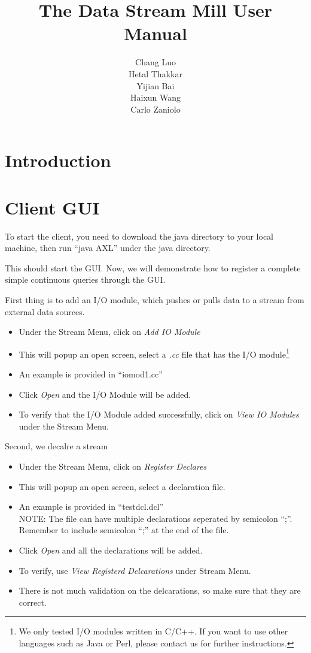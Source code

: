 \documentclass[10pt]{report}
\title{\Huge \bf The Data Stream Mill User Manual \\}
\author{\Large Chang Luo \\[0.1cm]\Large Hetal Thakkar\\[0.1cm]\Large Yijian Bai \\[0.1cm] \Large Haixun Wang\\[0.1cm] \Large Carlo Zaniolo}
\begin{document}
\maketitle

\tableofcontents
\chapter{Introduction}
\chapter{Client GUI}
To start the client, you need to download the java directory to your local machine, then run ``java AXL'' under the java directory.

This should start the GUI. Now, we
will demonstrate how to register a complete simple continuous queries through the GUI.

First thing is to add an I/O module, which pushes or pulls data to a
stream from external data sources.
\begin{itemize}
  \item Under the Stream Menu, click on {\em Add IO Module}
  \item This will popup an open screen, select a {\em.cc} file that has the
I/O module\footnote{We only tested I/O modules written in C/C++.  If you want to use other languages such as Java or Perl, please contact us for further instructions.}
  \item An example is provided in ``iomod1.cc''
  \item Click {\em Open} and the I/O Module will be added.
  \item To verify that the I/O Module added successfully, click on {\em View IO Modules} under the Stream Menu.
\end{itemize}

Second, we decalre a stream
\begin{itemize}
  \item Under the Stream Menu, click on {\em Register Declares}
  \item This will popup an open screen, select a declaration file.
  \item An example is provided in ``testdcl.dcl''\\
    NOTE: The file can have multiple declarations seperated by semicolon ``;''.
Remember to include semicolon ``;'' at the end of the file.
  \item Click {\em Open} and all the declarations will be added.
  \item To verify, use {\em View Registerd Delcarations} under Stream Menu.
  \item There is not much validation on the delcarations, so make sure that
they are correct.
\end{itemize}
\end{document}
